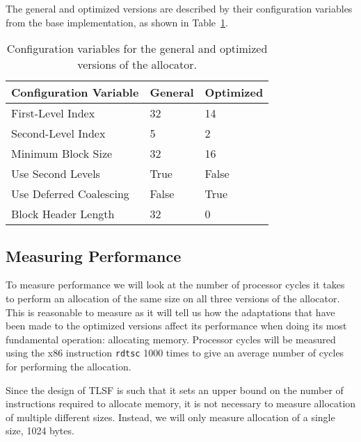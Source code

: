 The general and optimized versions are described by their configuration variables from the base implementation, as shown in Table~\ref{table:configuration-variables}.

\begin{table}[H]
\centering
\begin{tabular}{lllll}
\hline
Configuration Variable  & General  & \multicolumn{3}{l}{Optimized} \\ \hline
First-Level Index       & 32       & \multicolumn{3}{l}{14}        \\
Second-Level Index      & 5        & \multicolumn{3}{l}{2}         \\
Minimum Block Size      & 32       & \multicolumn{3}{l}{16 }       \\
Use Second Levels       & True     & \multicolumn{3}{l}{False}     \\
Use Deferred Coalescing & False    & \multicolumn{3}{l}{True}      \\
Block Header Length     & 32       & \multicolumn{3}{l}{0}        
\end{tabular}
\caption{Configuration variables for the general and optimized versions of the allocator.}
\label{table:configuration-variables}
\end{table}

\subsection{Measuring Performance}

To measure performance we will look at the number of processor cycles it takes to perform an allocation of the same size on all three versions of the allocator. This is reasonable to measure as it will tell us how the adaptations that have been made to the optimized versions affect its performance when doing its most fundamental operation: allocating memory. Processor cycles will be measured using the x86 instruction \texttt{rdtsc} 1000 times to give an average number of cycles for performing the allocation. 

Since the design of TLSF is such that it sets an upper bound on the number of instructions required to allocate memory, it is not necessary to measure allocation of multiple different sizes. Instead, we will only measure allocation of a single size, 1024 bytes.

